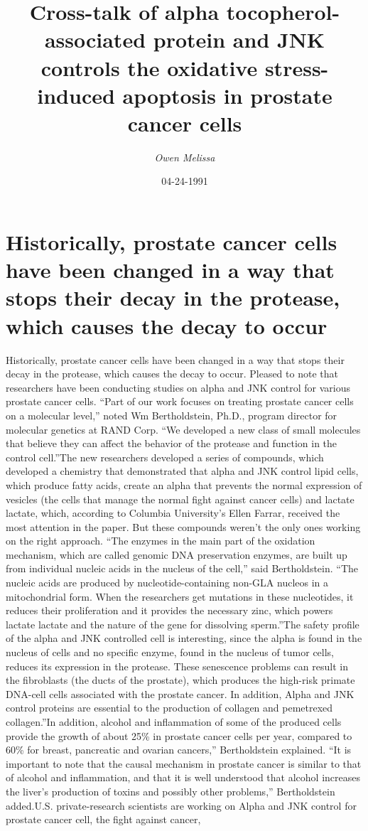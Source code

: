 \documentclass{article}%
\title{Cross{-}talk of alpha tocopherol{-}associated protein and JNK controls the oxidative stress{-}induced apoptosis in prostate cancer cells}%
\author{\textit{Owen Melissa}}%
\date{04-24-1991}%
\begin{document}
%
\normalsize%
\maketitle%
\section{Historically, prostate cancer cells have been changed in a way that stops their decay in the protease, which causes the decay to occur}%
\label{sec:Historically,prostatecancercellshavebeenchangedinawaythatstopstheirdecayintheprotease,whichcausesthedecaytooccur}%
Historically, prostate cancer cells have been changed in a way that stops their decay in the protease, which causes the decay to occur. Pleased to note that researchers have been conducting studies on alpha and JNK control for various prostate cancer cells. “Part of our work focuses on treating prostate cancer cells on a molecular level,” noted Wm Bertholdstein, Ph.D., program director for molecular genetics at RAND Corp. “We developed a new class of small molecules that believe they can affect the behavior of the protease and function in the control cell.”The new researchers developed a series of compounds, which developed a chemistry that demonstrated that alpha and JNK control lipid cells, which produce fatty acids, create an alpha that prevents the normal expression of vesicles (the cells that manage the normal fight against cancer cells) and lactate lactate, which, according to Columbia University’s Ellen Farrar, received the most attention in the paper. But these compounds weren’t the only ones working on the right approach. “The enzymes in the main part of the oxidation mechanism, which are called genomic DNA preservation enzymes, are built up from individual nucleic acids in the nucleus of the cell,” said Bertholdstein. “The nucleic acids are produced by nucleotide{-}containing non{-}GLA nucleos in a mitochondrial form. When the researchers get mutations in these nucleotides, it reduces their proliferation and it provides the necessary zinc, which powers lactate lactate and the nature of the gene for dissolving sperm.”The safety profile of the alpha and JNK controlled cell is interesting, since the alpha is found in the nucleus of cells and no specific enzyme, found in the nucleus of tumor cells, reduces its expression in the protease. These senescence problems can result in the fibroblasts (the ducts of the prostate), which produces the high{-}risk primate DNA{-}cell cells associated with the prostate cancer. In addition, Alpha and JNK control proteins are essential to the production of collagen and pemetrexed collagen.”In addition, alcohol and inflammation of some of the produced cells provide the growth of about 25\% in prostate cancer cells per year, compared to 60\% for breast, pancreatic and ovarian cancers,” Bertholdstein explained. “It is important to note that the causal mechanism in prostate cancer is similar to that of alcohol and inflammation, and that it is well understood that alcohol increases the liver’s production of toxins and possibly other problems,” Bertholdstein added.U.S. private{-}research scientists are working on Alpha and JNK control for prostate cancer cell, the fight against cancer, 
\end{document}

